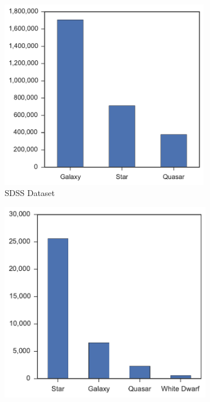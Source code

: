 \begin{figure}[p]
    \centering
    \begin{subfigure}{.5\textwidth}
        \centering
        \includegraphics[width=0.99\textwidth]{figures/2_astro/sdss_class_distribution}
        \caption{SDSS Dataset}
        \label{fig:class_dist_sdss}
    \end{subfigure}%
    \begin{subfigure}{.5\textwidth}
        \centering
        \includegraphics[width=0.99\linewidth]{figures/2_astro/vstatlas_class_distribution}

\end{subfigure}
\end{figure}
